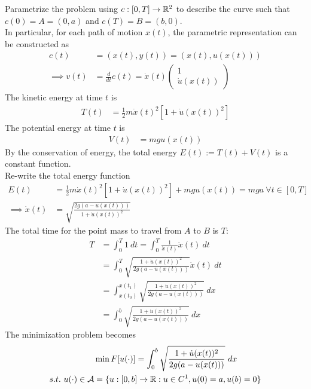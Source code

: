\documentclass{article}
\begin{document}
	\begin{example}
		Parametrize the problem using $c: [0, T] \to \mathbb{R}^2$ to describe the curve such that $c(0) = A = (0, a)$ and $c(T) = B = (b, 0)$. \\
		In particular, for each path of motion $x(t)$, the parametric representation can be constructed as
		\begin{align}
			c(t) &= (x(t), y(t)) = (x(t), u(x(t))) \\
			\implies v(t) &= \frac{d}{dt}c(t) = \dot{x}(t) \begin{pmatrix}
				1 \\ \dot{u}(x(t))
			\end{pmatrix}
		\end{align} 
		The kinetic energy at time $t$ is 
		\begin{align}
			T(t) &= \frac{1}{2} m \dot{x}(t)^2 [1 + \dot{u}(x(t))^2]
		\end{align}
		The potential energy at time $t$ is
		\begin{align}
			V(t) &= m g u(x(t))
		\end{align}
		By the conservation of energy, the total energy $E(t) := T(t) + V(t)$ is a constant function. \\
		Re-write the total energy function
		\begin{align}
			E(t) &= \frac{1}{2} m \dot{x}(t)^2 [1 + \dot{u}(x(t))^2] + m g u(x(t)) = m g a\ \forall t \in [0, T] \\
			\implies \dot{x}(t) &= \sqrt{\frac{2g(a - u(x(t)))}{1 + \dot{u}(x(t))^2}}
		\end{align}
		The total time for the point mass to travel from $A$ to $B$ is $T$:
		\begin{align}
			T &= \int_0^T 1\ dt = \int_0^T \frac{1}{\dot{x}(t)} \dot{x}(t)\ dt \\
			&= \int_0^T \sqrt{\frac{1 + \dot{u}(x(t))^2}{2g(a - u(x(t)))}} \dot{x}(t)\ dt \\
			&= \int_{x(t_0)}^{x(t_1)} \sqrt{\frac{1 + \dot{u}(x(t))^2}{2g(a - u(x(t)))}}\ dx \\
			&= \int_0^b \sqrt{\frac{1 + \dot{u}(x(t))^2}{2g(a - u(x(t)))}}\ dx
		\end{align}
		The minimization problem becomes 
		\begin{align}
			&\min F[u(\cdot)] = \int_0^b \sqrt{\frac{1 + \dot{u}(x(t))^2}{2g(a - u(x(t)))}}\ dx \\
			s.t.\ u(\cdot) \in \mathcal{{A}} &= \{u:[0, b] \to \mathbb{R}: u \in C^1, u(0) = a, u(b) = 0 \}
		\end{align}

\end{example}
\end{document}
